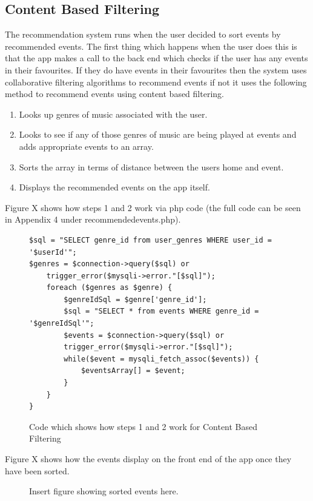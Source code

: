 \subsection{Content Based Filtering}
The recommendation system runs when the user decided to sort events by recommended events. The first thing which happens when the user does this is that the app makes a call to the back end which checks if the user has any events in their favourites. If they do have events in their favourites then the system uses collaborative filtering algorithms to recommend events if not it uses the following method to recommend events using content based filtering.
\begin{enumerate}
  \item Looks up genres of music associated with the user.
  \item Looks to see if any of those genres of music are being played at events and adds appropriate events to an array.
  \item Sorts the array in terms of distance between the users home and event.
  \item Displays the recommended events on the app itself.
\end{enumerate}
Figure X shows how steps 1 and 2 work via php code (the full code can be seen in Appendix 4 under recommendedevents.php).
\begin{figure}
\begin{verbatim}
$sql = "SELECT genre_id from user_genres WHERE user_id = '$userId'";
$genres = $connection->query($sql) or 
    trigger_error($mysqli->error."[$sql]");
    foreach ($genres as $genre) {
        $genreIdSql = $genre['genre_id'];
        $sql = "SELECT * from events WHERE genre_id = '$genreIdSql'";
        $events = $connection->query($sql) or 
        trigger_error($mysqli->error."[$sql]");
        while($event = mysqli_fetch_assoc($events)) {
            $eventsArray[] = $event;
        }
    }
}
\end{verbatim}
\caption{Code which shows how steps 1 and 2 work for Content Based Filtering}
\end{figure}
Figure X shows how the events display on the front end of the app once they have been sorted.
\begin{figure}
\caption{Insert figure showing sorted events here.}
\end{figure}

